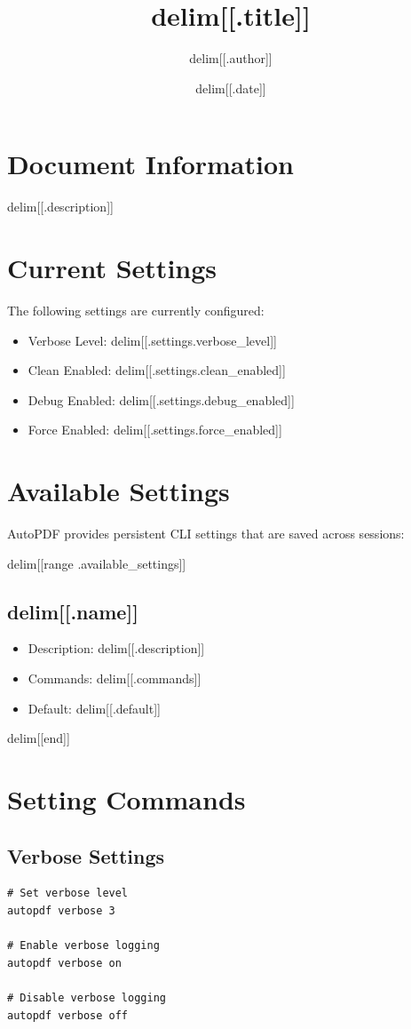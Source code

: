 \documentclass{article}
\title{delim[[.title]]}
\author{delim[[.author]]}
\date{delim[[.date]]}
\begin{document}
\maketitle

\section{Document Information}
delim[[.description]]

\section{Current Settings}
The following settings are currently configured:

\begin{itemize}
\item Verbose Level: delim[[.settings.verbose_level]]
\item Clean Enabled: delim[[.settings.clean_enabled]]
\item Debug Enabled: delim[[.settings.debug_enabled]]
\item Force Enabled: delim[[.settings.force_enabled]]
\end{itemize}

\section{Available Settings}
AutoPDF provides persistent CLI settings that are saved across sessions:

delim[[range .available_settings]]
\subsection{delim[[.name]]}
\begin{itemize}
\item Description: delim[[.description]]
\item Commands: delim[[.commands]]
\item Default: delim[[.default]]
\end{itemize}
delim[[end]]

\section{Setting Commands}
\subsection{Verbose Settings}
\begin{verbatim}
# Set verbose level
autopdf verbose 3

# Enable verbose logging
autopdf verbose on

# Disable verbose logging
autopdf verbose off
\end{verbatim}
\end{document}

